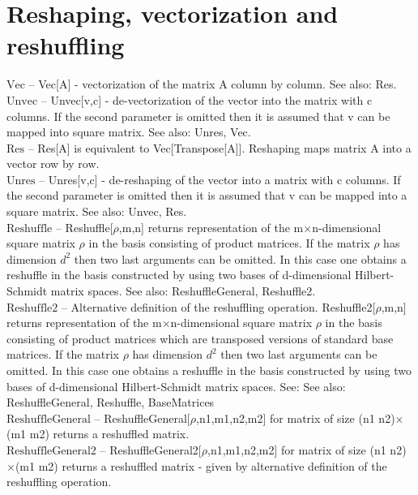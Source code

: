 \documentclass[a4paper,10pt]{scrartcl}
\begin{document}
\section{Reshaping, vectorization and reshuffling}

\noindent\textbf{$ \text{Vec} $ }-- Vec[A] - vectorization of the matrix A column by column. See also: Res.$  $\\[8pt]
\noindent\textbf{$ \text{Unvec} $ }-- Unvec[v,c] - de-vectorization of the vector into the matrix with c columns. If the second parameter is omitted then it is assumed that v can be mapped into square matrix. See also: Unres, Vec.$  $\\[8pt]
\noindent\textbf{$ \text{Res} $ }-- Res[A] is equivalent to Vec[Transpose[A]]. Reshaping maps matrix A into a vector row by row.$  $\\[8pt]
\noindent\textbf{$ \text{Unres} $ }-- Unres[v,c] - de-reshaping of the vector into a matrix with c columns. If the second parameter is omitted then it is assumed that v can be mapped into a square matrix. See also: Unvec, Res.$  $\\[8pt]
\noindent\textbf{$ \text{Reshuffle} $ }-- Reshuffle[$\rho $,m,n] returns representation of the m$\times $n-dimensional square matrix $\rho $ in the basis consisting of product matrices. If  the matrix $\rho $ has dimension $ d^2 $ then two last arguments can be omitted. In this case one obtains a reshuffle in the basis constructed by using two bases of d-dimensional Hilbert-Schmidt matrix spaces. See also: ReshuffleGeneral, Reshuffle2.$  $\\[8pt]
\noindent\textbf{$ \text{Reshuffle2} $ }-- Alternative definition of the reshuffling operation. Reshuffle2[$\rho $,m,n] returns representation of the m$\times $n-dimensional square matrix $\rho $ in the basis consisting of product matrices which are transposed versions of standard base matrices. If the matrix $\rho $ has dimension $ d^2 $ then two last arguments can be omitted. In this case one obtains a reshuffle in the basis constructed by using two bases of d-dimensional Hilbert-Schmidt matrix spaces. See: See also: ReshuffleGeneral, Reshuffle, BaseMatrices$  $\\[8pt]
\noindent\textbf{$ \text{ReshuffleGeneral} $ }-- ReshuffleGeneral[$\rho $,n1,m1,n2,m2] for matrix of size (n1 n2)$\times $(m1 m2) returns a reshuffled matrix.$  $\\[8pt]
\noindent\textbf{$ \text{ReshuffleGeneral2} $ }-- ReshuffleGeneral2[$\rho $,n1,m1,n2,m2] for matrix of size (n1 n2)$\times $(m1 m2) returns a reshuffled matrix - given by alternative definition of the reshuffling operation.$  $\\[8pt]
\end{document}
